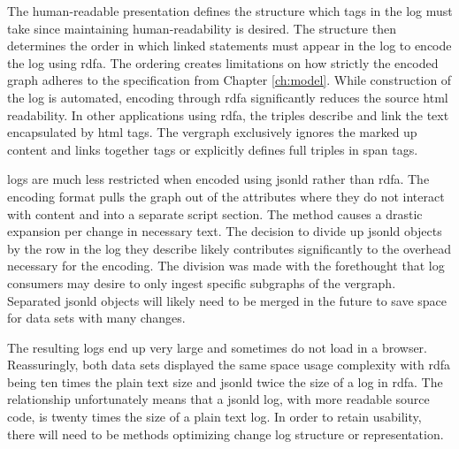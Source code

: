 The human-readable presentation defines the structure which tags in the \gls{log} must take since maintaining human-readability is desired.
The structure then determines the order in which \gls{linked} statements must appear in the log to encode the \gls{log} using \gls{rdfa}.
The ordering creates limitations on how strictly the encoded graph adheres to the specification from Chapter \ref{ch:model}.
While construction of the \gls{log} is automated, encoding through \gls{rdfa} significantly reduces the source \gls{html} readability.
In other applications using \gls{rdfa}, the triples describe and link the text encapsulated by \gls{html} tags.
The \gls{vergraph} exclusively ignores the marked up content and links together tags or explicitly defines full triples in span tags.

\Glspl{log} are much less restricted when encoded using \gls{jsonld} rather than \gls{rdfa}.
The encoding format pulls the graph out of the attributes where they do not interact with content and into a separate script section.
The method causes a drastic expansion per \gls{change} in necessary text.
The decision to divide up \gls{jsonld} objects by the row in the \gls{log} they describe likely contributes significantly to the overhead necessary for the encoding.
The division was made with the forethought that \gls{log} consumers may desire to only ingest specific subgraphs of the \gls{vergraph}.
Separated \gls{jsonld} objects will likely need to be merged in the future to save space for data sets with many changes.

The resulting logs end up very large and sometimes do not load in a browser.
Reassuringly, both data sets displayed the same space usage complexity with \gls{rdfa} being ten times the plain text size and \gls{jsonld} twice the size of a \gls{log} in \gls{rdfa}.
The relationship unfortunately means that a \gls{jsonld} \gls{log}, with more readable source code, is twenty times the size of a plain text \gls{log}.
In order to retain usability, there will need to be methods optimizing change log structure or representation.